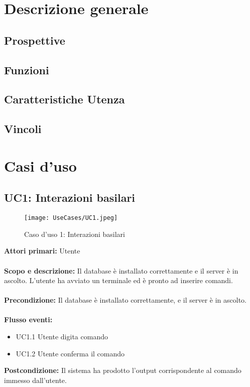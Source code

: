 \documentclass{scalatekids-article}
\begin{document}
\section{Descrizione generale}
\subsection{Prospettive}
\subsection{Funzioni}
\subsection{Caratteristiche Utenza}
\subsection{Vincoli}
\section{Casi d'uso}
\subsection{UC1: Interazioni basilari}
\begin{figure}[H]
  \texttt{[image: UseCases/UC1.jpeg]}
  \caption{Caso d'uso 1: Interazioni basilari}
\end{figure}
\textbf{Attori primari:} Utente\\ \\
\textbf{Scopo e descrizione:} Il database è installato correttamente e il server è in ascolto.
L'utente ha avviato un terminale ed è pronto ad inserire comandi.\\ \\
\textbf{Precondizione:} Il database è installato correttamente, e il server è in ascolto.\\ \\
\textbf{Flusso eventi:}
\begin{itemize}
\item UC1.1 Utente digita comando
\item UC1.2 Utente conferma il comando
\end{itemize}
\textbf{Postcondizione:} Il sistema ha prodotto l'output corrispondente al comando immesso dall'utente.
\end{document}
